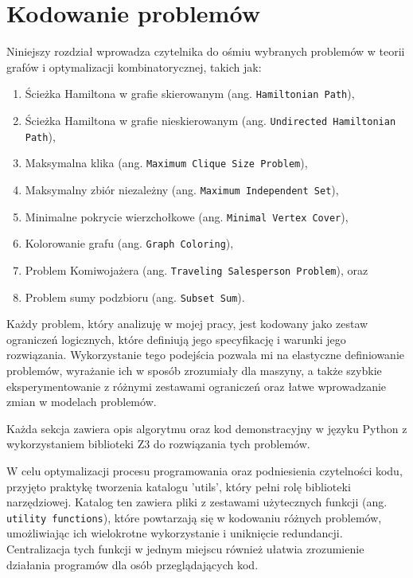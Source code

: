 \chapter{Kodowanie problemów}

Niniejszy rozdział wprowadza czytelnika do ośmiu wybranych problemów w teorii grafów i optymalizacji kombinatorycznej, takich jak:
\begin{enumerate}
	\item Ścieżka Hamiltona w grafie skierowanym (ang. \texttt{Hamiltonian Path}),
	\item Ścieżka Hamiltona w grafie nieskierowanym (ang. \texttt{Undirected Hamiltonian Path}),
	\item Maksymalna klika (ang. \texttt{Maximum Clique Size Problem}), 
	\item Maksymalny zbiór niezależny (ang. \texttt{Maximum Independent Set}),
	\item Minimalne pokrycie wierzchołkowe (ang. \texttt{Minimal Vertex Cover}),
	\item Kolorowanie grafu (ang. \texttt{Graph Coloring}),
	\item Problem Komiwojażera (ang. \texttt{Traveling Salesperson Problem}),  
	oraz 
	\item Problem sumy podzbioru (ang. \texttt{Subset Sum}).    
\end{enumerate}

Każdy problem, który analizuję w mojej pracy, jest kodowany jako zestaw ograniczeń logicznych, które definiują jego specyfikację i warunki jego rozwiązania. Wykorzystanie tego podejścia pozwala mi na elastyczne definiowanie problemów, wyrażanie ich w sposób zrozumiały dla maszyny, a także szybkie eksperymentowanie z różnymi zestawami ograniczeń oraz łatwe wprowadzanie zmian w modelach problemów.

Każda sekcja zawiera opis algorytmu oraz kod demonstracyjny w języku Python z wykorzystaniem biblioteki Z3 do rozwiązania tych problemów.

W celu optymalizacji procesu programowania oraz podniesienia czytelności kodu, przyjęto praktykę tworzenia katalogu 'utils', który pełni rolę biblioteki narzędziowej. Katalog ten zawiera pliki z zestawami użytecznych funkcji (ang. \texttt{utility functions}), które powtarzają się w kodowaniu różnych problemów, umożliwiając ich wielokrotne wykorzystanie i uniknięcie redundancji. Centralizacja tych funkcji w jednym miejscu również ułatwia zrozumienie działania programów dla osób przeglądających kod. 

